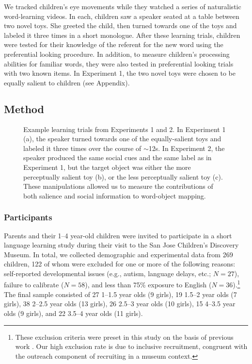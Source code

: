 \documentclass[man,floatsintext]{apa6}
\begin{document}
We tracked children's eye movements while they watched a series of naturalistic word-learning videos. In each, children saw a speaker seated at a table between two novel toys. She greeted the child, then turned towards one of the toys and labeled it three times in a short monologue. After these learning trials, children were tested for their knowledge of the referent for the new word using the preferential looking procedure. In addition, to measure children's processing abilities for familiar words, they were also tested in preferential looking trials with two known items. In Experiment 1, the two novel toys were chosen to be equally salient to children (see Appendix).

\subsection{Method}

\begin{figure}[tb]
	\caption{\label{fig:design} Example learning trials from Experiments 1 and 2. In Experiment 1 (a), the speaker turned towards one of the equally-salient toys and labeled it three times over the course of $\sim$12s. In Experiment 2, the speaker produced the same social cues and the same label as in Experiment 1, but the target object was either the more perceptually salient toy (b), or the less perceptually salient toy (c). These manipulations allowed us to measure the contributions of both salience and social information to word-object mapping.}
\end{figure}

\subsubsection{Participants}

Parents and their 1--4 year-old children were invited to participate in a short language learning study during their visit to the San Jose Children's Discovery Museum. In total, we collected demographic and experimental data from 269 children, 122 of whom were excluded for one or more of the following reasons: self-reported developmental issues (e.g., autism, language delays, etc.; $N= 27$), failure to calibrate ($N=58$), and less than 75\% exposure to English ($N=36$).\footnote{These exclusion criteria were preset in this study on the basis of previous work \cite{Yurovsky2013c}. Our high exclusion rate is due to inclusive recruitment, congruent with the outreach component of recruiting in a museum context.} The final sample consisted of 27 1--1.5 year olds (9 girls), 19 1.5--2 year olds (7 girls), 38 2--2.5 year olds (13 girls), 26 2.5--3 year olds (10 girls), 15 4--3.5 year olds (9 girls), and 22 3.5--4 year olds (11 girls).
\end{document}
